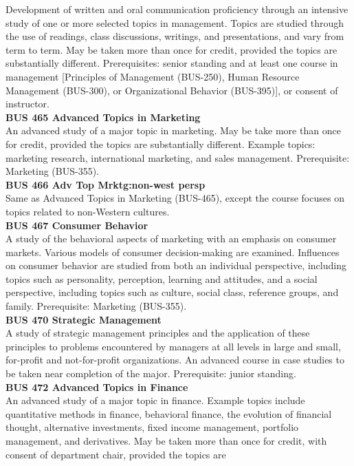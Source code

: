 \documentclass[
  letterpaper,
]{scrbook}
\begin{document}
Development of written and oral communication proficiency through an
intensive study of one or more selected topics in management. Topics are
studied through the use of readings, class discussions, writings, and
presentations, and vary from term to term. May be taken more than once
for credit, provided the topics are substantially different.
Prerequisites: senior standing and at least one course in management
{[}Principles of Management (BUS-250), Human Resource Management
(BUS-300), or Organizational Behavior (BUS-395){]}, or consent of
instructor.\\
\textbf{BUS 465 Advanced Topics in Marketing}\\
An advanced study of a major topic in marketing. May be take more than
once for credit, provided the topics are substantially different.
Example topics: marketing research, international marketing, and sales
management. Prerequisite: Marketing (BUS-355).\\
\textbf{BUS 466 Adv Top Mrktg:non-west persp}\\
Same as Advanced Topics in Marketing (BUS-465), except the course
focuses on topics related to non-Western cultures.\\
\textbf{BUS 467 Consumer Behavior}\\
A study of the behavioral aspects of marketing with an emphasis on
consumer markets. Various models of consumer decision-making are
examined. Influences on consumer behavior are studied from both an
individual perspective, including topics such as personality,
perception, learning and attitudes, and a social perspective, including
topics such as culture, social class, reference groups, and family.
Prerequisite: Marketing (BUS-355).\\
\textbf{BUS 470 Strategic Management}\\
A study of strategic management principles and the application of these
principles to problems encountered by managers at all levels in large
and small, for-profit and not-for-profit organizations. An advanced
course in case studies to be taken near completion of the major.
Prerequisite: junior standing.\\
\textbf{BUS 472 Advanced Topics in Finance}\\
An advanced study of a major topic in finance. Example topics include
quantitative methods in finance, behavioral finance, the evolution of
financial thought, alternative investments, fixed income management,
portfolio management, and derivatives. May be taken more than once for
credit, with consent of department chair, provided the topics are
\end{document}
